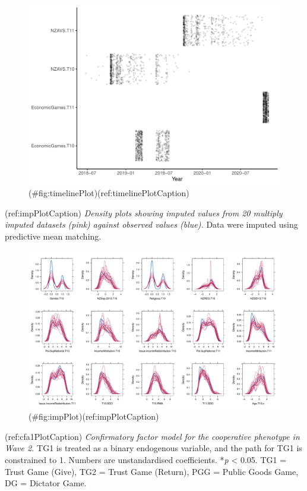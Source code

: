 \begin{appendix}
\begin{figure}
\centering
\includegraphics{manuscript_files/figure-latex/timelinePlot-1.pdf}
\caption{(\#fig:timelinePlot)(ref:timelinePlotCaption)}
\end{figure}

\newpage

(ref:impPlotCaption) \emph{Density plots showing imputed values from 20
multiply imputed datasets (pink) against observed values (blue).} Data
were imputed using predictive mean matching.

\begin{figure}
\centering
\includegraphics{manuscript_files/figure-latex/impPlot-1.pdf}
\caption{(\#fig:impPlot)(ref:impPlotCaption)}
\end{figure}

\newpage

(ref:cfa1PlotCaption) \emph{Confirmatory factor model for the
cooperative phenotype in Wave 2.} TG1 is treated as a binary endogenous
variable, and the path for TG1 is constrained to 1. Numbers are
unstandardised coefficients. *\emph{p} \textless{} 0.05. TG1 = Trust
Game (Give), TG2 = Trust Game (Return), PGG = Public Goods Game, DG =
Dictator Game.


\end{appendix}
